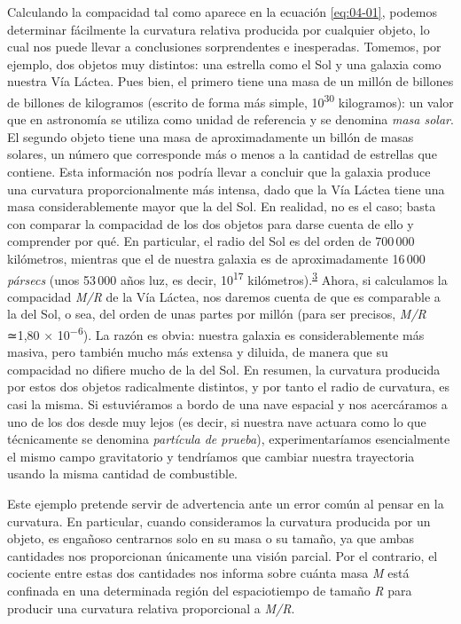 Calculando la compacidad tal como aparece en la ecuación \eqref{eq:04-01}, podemos
determinar fácilmente la curvatura relativa producida por cualquier objeto, lo cual
nos puede llevar a conclusiones sorprendentes e inesperadas. Tomemos, por ejemplo,
dos objetos muy distintos: una estrella como el Sol y una galaxia como nuestra
Vía Láctea. Pues bien, el primero tiene una masa de un millón de
billones de billones de kilogramos (escrito de forma más simple,
10\textsuperscript{30} kilogramos): un valor que en astronomía se utiliza como unidad
de referencia y se denomina \emph{masa solar}. El segundo objeto tiene una masa de
aproximadamente un billón de masas solares, un número que corresponde más o menos
a la cantidad de estrellas que contiene. Esta información nos podría llevar a
concluir que la galaxia produce una curvatura proporcionalmente más intensa, dado
que la Vía Láctea tiene una masa considerablemente mayor que la del
Sol. En realidad, no es el caso; basta con comparar la compacidad de los dos
objetos para darse cuenta de ello y comprender por qué. En particular, el radio del
Sol es del orden de 700\,000 kilómetros, mientras que el de nuestra galaxia es de
aproximadamente 16\,000 \emph{pársecs} (unos 53\,000 años luz, es decir,
10\textsuperscript{17} kilómetros).\textsuperscript{\hyperlink{note:04-03}{3}} Ahora,
si calculamos la compacidad \emph{M/R} de la Vía
Láctea, nos daremos cuenta de que es comparable a la del Sol, o
sea, del orden de unas partes por millón (para ser precisos,
\emph{M/R} ≃1,80 × 10\textsuperscript{−6}). La razón es obvia: nuestra galaxia es
considerablemente más masiva, pero también mucho más extensa y diluida, de manera
que su compacidad no difiere mucho de la del Sol. En resumen, la curvatura producida
por estos dos objetos radicalmente distintos, y por tanto el radio de curvatura,
es casi la misma. Si estuviéramos a bordo de una nave espacial y nos acercáramos a
uno de los dos desde muy lejos (es decir, si nuestra nave actuara como lo que
técnicamente se denomina \emph{partícula de prueba}),
experimentaríamos esencialmente el mismo campo gravitatorio y tendríamos que cambiar
nuestra trayectoria usando la misma cantidad de combustible.

Este ejemplo pretende servir de advertencia ante un error común al pensar en la
curvatura. En particular, cuando consideramos la curvatura producida por un objeto,
es engañoso centrarnos solo en su masa o su tamaño, ya que ambas cantidades nos
proporcionan únicamente una visión parcial. Por el contrario, el cociente entre
estas dos cantidades nos informa sobre cuánta masa \emph{M} está confinada en una
determinada región del espaciotiempo de tamaño \emph{R} para producir una curvatura
relativa proporcional a \emph{M/R}.

